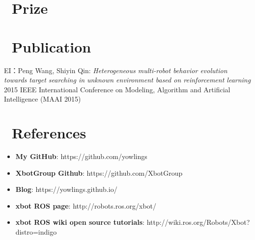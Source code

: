 \documentclass{resume}
\begin{document}
\section{\faGratipay\ Prize}

\section{\faBook\ Publication}
EI：Peng Wang, Shiyin Qin:
\textit{Heterogeneous multi-robot behavior evolution towards target searching in unknown environment based on reinforcement learning} 
2015 IEEE International Conference on Modeling, Algorithm and Artificial Intelligence (MAAI 2015)

\section{\faInfoCircle\ References}
\begin{itemize}[parsep=0.5ex]  
  \item \textbf{My GitHub}: https://github.com/yowlings
  \item \textbf{XbotGroup Github}: https://github.com/XbotGroup
  \item \textbf{Blog}: https://yowlings.github.io/
  \item \textbf{xbot ROS page}: http://robots.ros.org/xbot/
  \item \textbf{xbot ROS wiki open source tutorials}: http://wiki.ros.org/Robots/Xbot?distro=indigo
\end{itemize}

% 
\end{document}

